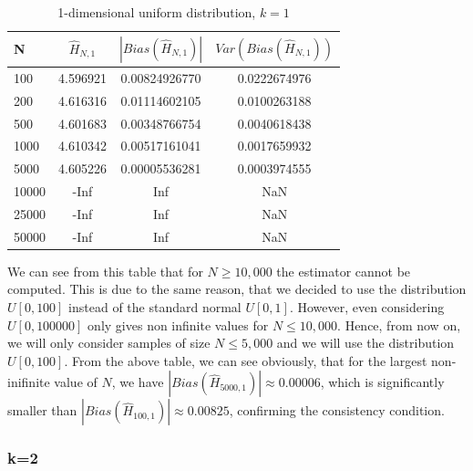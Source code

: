 \documentclass{article}
\begin{document}
\begin{table}
\caption{1-dimensional uniform distribution, $k=1$} \label{uniform_k=1_table}
\begin{center}
\begin{tabular}{| l | c c c|} 
\toprule
N & $\hat{H}_{N, 1}$ & $|Bias(\hat{H}_{N, 1})|$ & $Var(Bias(\hat{H}_{N, 1}))$ \\
\midrule[1pt]
100     & 4.596921     & 0.00824926770     & 0.0222674976  \\
200     & 4.616316     & 0.01114602105     & 0.0100263188  \\
500     & 4.601683     & 0.00348766754     & 0.0040618438  \\
1000    & 4.610342     & 0.00517161041     & 0.0017659932  \\
5000    & 4.605226     & 0.00005536281     & 0.0003974555  \\
10000   &     -Inf     &           Inf     &          NaN  \\
25000   &     -Inf     &           Inf     &          NaN  \\
50000   &     -Inf     &           Inf     &          NaN  \\
\hline
\end{tabular}
\end{center}
\end{table}

We can see from this table that for $N \geq 10,000$ the estimator cannot be computed. This is due to the same reason, that we decided to use the distribution $U[0,100]$ instead of the standard normal $U[0,1]$. However, even considering $U[0,100000]$ only gives non infinite values for $N \leq 10,000$. Hence, from now on, we will only consider samples of size $N \leq 5,000$ and we will use the distribution $U[0,100]$. From the above table, we can see obviously, that for the largest non-inifinite value of $N$, we have $|Bias(\hat{H}_{5000, 1})| \approx 0.00006$, which is significantly smaller than $|Bias(\hat{H}_{100, 1})| \approx 0.00825$, confirming the consistency condition.





\subsubsection{k=2} \label{U_k=2}
\end{document}
